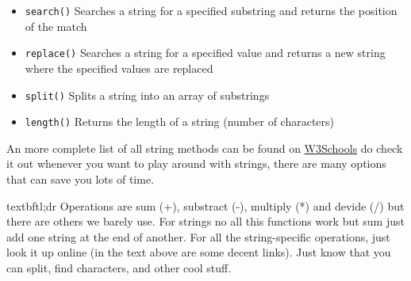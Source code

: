 \begin{itemize}
    \item \texttt{search()} Searches a string for a specified substring and returns the position of the match
    \item \texttt{replace()} Searches a string for a specified value and returns a new string where the specified values are replaced
    \item \texttt{split()} Splits a string into an array of substrings
    \item \texttt{length()} Returns the length of a string (number of characters)
\end{itemize}

An more complete list of all string methods can be found on \href{https://www.w3schools.com/jsref/jsref_obj_string.asp}{W3Schools} do check it out whenever you want to play around with strings, there are many options that can save you lots of time.

\large{textbf{tl;dr}}
Operations are sum (+), substract (-), multiply (*) and devide (/) but there are others we barely use. For strings no all this functions work but sum just add one string at the end of another. For all the string-specific operations, just look it up online (in the text above are some decent links). Just know that you can split, find characters, and other cool stuff.

